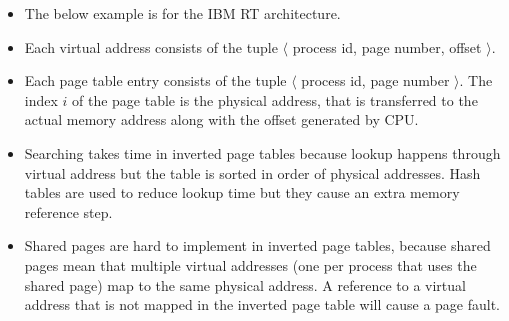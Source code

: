 \documentclass{article}
\theoremstyle{plain}
\theoremstyle{definition}
\begin{document}
\begin{itemize}
    \item The below example is for the IBM RT architecture. 
    
    \item Each virtual address consists of the tuple $\langle$ process id, page number, offset $\rangle$. 
    
    \item Each page table entry consists of the tuple $\langle$ process id, page number $\rangle$. The index $i$ of the page table is the physical address, that is transferred to the actual memory address along with the offset generated by CPU. 
    
    \item Searching takes time in inverted page tables because lookup happens through virtual address but the table is sorted in order of physical addresses. Hash tables are used to reduce lookup time but they cause an extra memory reference step. 
    
    \item Shared pages are hard to implement in inverted page tables, because shared pages mean that multiple virtual addresses (one per process that uses the shared page) map to the same physical address. A reference to a virtual address that is not mapped in the inverted page table will cause a page fault. 
\end{itemize}
\end{document}
